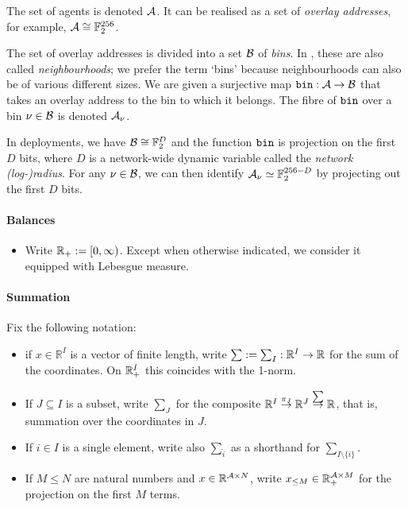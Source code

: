 The set of agents is denoted $\mathcal{A}$.
%
It can be realised as a set of \emph{overlay addresses}, for example, $\mathcal{A} \cong \mathbb{F}_2^{256}$.

The set of overlay addresses is divided into a set $\mathcal{B}$ of \emph{bins}.
%
In \cite{book-of-swarm}, these are also called \emph{neighbourhoods}; we prefer the term `bins' because neighbourhoods can also be of various different sizes.
%
We are given a surjective map $\mathtt{bin}:\mathcal{A}\rightarrow\mathcal{B}$ that takes an overlay address to the bin to which it belongs.
%
The fibre of $\mathtt{bin}$ over a bin $\nu\in\mathcal{B}$ is denoted $\mathcal{A}_\nu$.

In deployments, we have $\mathcal{B}\cong \mathbb{F}_2^D$ and the function $\mathtt{bin}$ is projection on the first $D$ bits, where $D$ is a network-wide dynamic variable called the \emph{network (log-)radius}.
%
For any $\nu\in\mathcal{B}$, we can then identify $\mathcal{A}_\nu\simeq\mathbb{F}_2^{256-D}$ by projecting out the first $D$ bits.


\paragraph{Balances}
\begin{itemize}
  \item 
    Write $\mathbb{R}_+ := [0,\infty)$. Except when otherwise indicated, we consider it equipped with Lebesgue measure.

\end{itemize}

\paragraph{Summation}

Fix the following notation:
\begin{itemize}
  \item if $x\in \mathbb{R}^I$ is a vector of finite length, write $\sum:=\sum_I:\mathbb{R}^I\rightarrow\mathbb{R}$ for the sum of the coordinates. On $\mathbb{R}_+^I$ this coincides with the 1-norm.
  \item If $J\subseteq I$ is a subset, write $\sum_J$ for the composite $\mathbb{R}^I\stackrel{\pi_J}{\rightarrow}\mathbb{R}^J\stackrel{\sum}{\rightarrow}\mathbb{R}$, that is, summation over the coordinates in $J$.
  \item If $i\in I$ is a single element, write also $\sum_{\hat{i}}$ as a shorthand for $\sum_{I\setminus\{i\}}$.
  \item If $M\leq N$ are natural numbers and $x\in\mathbb{R}^{\mathcal{A}\times N}$, write $x_{\leq M}\in \mathbb{R}_+^{\mathcal{A}\times M}$ for the projection on the first $M$ terms.
\end{itemize}


